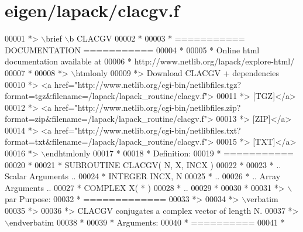 \hypertarget{eigen_2lapack_2clacgv_8f_source}{}\section{eigen/lapack/clacgv.f}
\label{eigen_2lapack_2clacgv_8f_source}

\begin{DoxyCode}
00001 \textcolor{comment}{*> \(\backslash\)brief \(\backslash\)b CLACGV}
00002 \textcolor{comment}{*}
00003 \textcolor{comment}{*  =========== DOCUMENTATION ===========}
00004 \textcolor{comment}{*}
00005 \textcolor{comment}{* Online html documentation available at }
00006 \textcolor{comment}{*            http://www.netlib.org/lapack/explore-html/ }
00007 \textcolor{comment}{*}
00008 \textcolor{comment}{*> \(\backslash\)htmlonly}
00009 \textcolor{comment}{*> Download CLACGV + dependencies }
00010 \textcolor{comment}{*> <a
       href="http://www.netlib.org/cgi-bin/netlibfiles.tgz?format=tgz&filename=/lapack/lapack\_routine/clacgv.f"> }
00011 \textcolor{comment}{*> [TGZ]</a> }
00012 \textcolor{comment}{*> <a
       href="http://www.netlib.org/cgi-bin/netlibfiles.zip?format=zip&filename=/lapack/lapack\_routine/clacgv.f"> }
00013 \textcolor{comment}{*> [ZIP]</a> }
00014 \textcolor{comment}{*> <a
       href="http://www.netlib.org/cgi-bin/netlibfiles.txt?format=txt&filename=/lapack/lapack\_routine/clacgv.f"> }
00015 \textcolor{comment}{*> [TXT]</a>}
00016 \textcolor{comment}{*> \(\backslash\)endhtmlonly }
00017 \textcolor{comment}{*}
00018 \textcolor{comment}{*  Definition:}
00019 \textcolor{comment}{*  ===========}
00020 \textcolor{comment}{*}
00021 \textcolor{comment}{*       SUBROUTINE CLACGV( N, X, INCX )}
00022 \textcolor{comment}{* }
00023 \textcolor{comment}{*       .. Scalar Arguments ..}
00024 \textcolor{comment}{*       INTEGER            INCX, N}
00025 \textcolor{comment}{*       ..}
00026 \textcolor{comment}{*       .. Array Arguments ..}
00027 \textcolor{comment}{*       COMPLEX            X( * )}
00028 \textcolor{comment}{*       ..}
00029 \textcolor{comment}{*  }
00030 \textcolor{comment}{*}
00031 \textcolor{comment}{*> \(\backslash\)par Purpose:}
00032 \textcolor{comment}{*  =============}
00033 \textcolor{comment}{*>}
00034 \textcolor{comment}{*> \(\backslash\)verbatim}
00035 \textcolor{comment}{*>}
00036 \textcolor{comment}{*> CLACGV conjugates a complex vector of length N.}
00037 \textcolor{comment}{*> \(\backslash\)endverbatim}
00038 \textcolor{comment}{*}
00039 \textcolor{comment}{*  Arguments:}
00040 \textcolor{comment}{*  ==========}
00041 \textcolor{comment}{*}

\end{DoxyCode}
